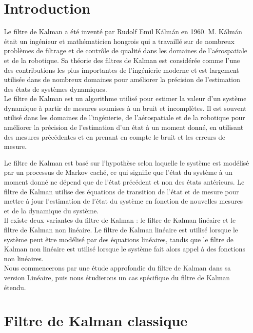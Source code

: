 \section{Introduction}
\label{chap:introduction}
Le filtre de Kalman a été inventé par Rudolf Emil Kálmán en 1960. M. Kálmán était un ingénieur et mathématicien hongrois qui a travaillé sur de nombreux problèmes de filtrage et de contrôle de qualité dans les domaines de l'aérospatiale et de la robotique. Sa théorie des filtres de Kalman est considérée comme l'une des contributions les plus importantes de l'ingénierie moderne et est largement utilisée dans de nombreux domaines pour améliorer la précision de l'estimation des états de systèmes dynamiques.\\

Le filtre de Kalman est un algorithme utilisé pour estimer la valeur d'un système dynamique à partir de mesures soumises à un bruit et incomplètes. Il est souvent utilisé dans les domaines de l'ingénierie, de l'aérospatiale et de la robotique pour améliorer la précision de l'estimation d'un état à un moment donné, en utilisant des mesures précédentes et en prenant en compte le bruit et les erreurs de mesure.

Le filtre de Kalman est basé sur l'hypothèse selon laquelle le système est modélisé par un processus de Markov caché, ce qui signifie que l'état du système à un moment donné ne dépend que de l'état précédent et non des états antérieurs. Le filtre de Kalman utilise des équations de transition de l'état et de mesure pour mettre à jour l'estimation de l'état du système en fonction de nouvelles mesures et de la dynamique du système.\\


Il existe deux variantes du filtre de Kalman : le filtre de Kalman linéaire et le filtre de Kalman non linéaire. Le filtre de Kalman linéaire est utilisé lorsque le système peut être modélisé par des équations linéaires, tandis que le filtre de Kalman non linéaire est utilisé lorsque le système fait alors appel à des fonctions non linéaires.\\

Nous commencerons par une étude approfondie du filtre de Kalman dans sa version Linéaire, puis nous étudierons un cas spécifique du filtre de Kalman étendu.  


\newpage

\section{Filtre de Kalman classique}

